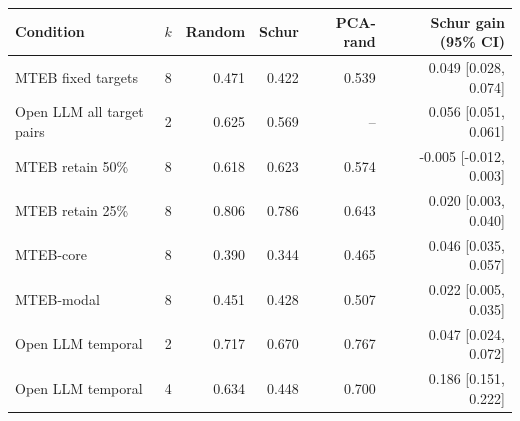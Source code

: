 \begin{tabular}{lrrrrr}
\toprule Condition & $k$ & Random & Schur & PCA-rand & Schur gain (95\% CI)\\\midrule
MTEB fixed targets & 8 & 0.471 & 0.422 & 0.539 & 0.049 [0.028, 0.074]\\
Open LLM all target pairs & 2 & 0.625 & 0.569 & -- & 0.056 [0.051, 0.061]\\
MTEB retain 50\% & 8 & 0.618 & 0.623 & 0.574 & -0.005 [-0.012, 0.003]\\
MTEB retain 25\% & 8 & 0.806 & 0.786 & 0.643 & 0.020 [0.003, 0.040]\\
MTEB-core & 8 & 0.390 & 0.344 & 0.465 & 0.046 [0.035, 0.057]\\
MTEB-modal & 8 & 0.451 & 0.428 & 0.507 & 0.022 [0.005, 0.035]\\
Open LLM temporal & 2 & 0.717 & 0.670 & 0.767 & 0.047 [0.024, 0.072]\\
Open LLM temporal & 4 & 0.634 & 0.448 & 0.700 & 0.186 [0.151, 0.222]\\
\bottomrule\end{tabular}